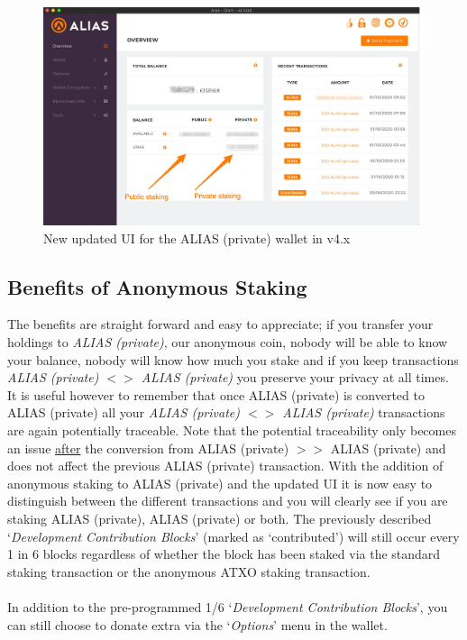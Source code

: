\begin{figure}[h]
	\centering
	\includegraphics[width=\textwidth]{Images/wallet_alias_2.jpg}
	\caption{New updated UI for the ALIAS (private) wallet in v4.x}
\end{figure}



\subsection{Benefits of Anonymous Staking}
The benefits are straight forward and easy to appreciate; if you transfer
your holdings to \textit{ALIAS (private)}, our anonymous coin, nobody will be able
to know your balance, nobody will know how much you stake and if you keep
transactions \textit{ALIAS (private) $<>$ ALIAS (private)} you preserve your privacy at all
times. It is useful however to remember that once ALIAS (private) is converted to
ALIAS (private) all your \textit{ALIAS (private) $<>$ ALIAS (private)} transactions are again potentially
traceable. Note that the potential traceability only becomes an issue
\underline{after} the conversion from ALIAS (private) $>>$ ALIAS (private) and does not affect
the previous ALIAS (private) transaction.
\newpage
\noindent
With the addition of anonymous staking to ALIAS (private) and the updated UI it
is now easy to distinguish between the different transactions and you will
clearly see if you are staking ALIAS (private), ALIAS (private) or both. The previously
described ‘\textit{Development Contribution Blocks}’ (marked as ‘contributed’)
will still occur every 1 in 6 blocks regardless of whether the block has
been staked via the standard staking transaction or the anonymous ATXO
staking transaction.
\\
\\
\noindent
In addition to the pre-programmed 1/6 ‘\textit{Development Contribution Blocks}’,
you can still choose to donate extra via the ‘\textit{Options}’ menu in the wallet.



